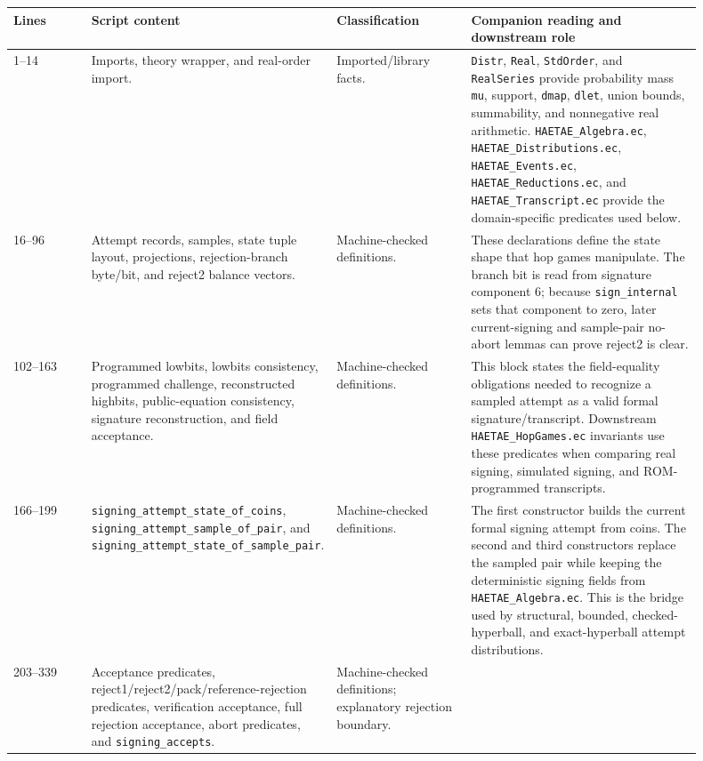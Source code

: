 \documentclass[11pt]{report}
\DeclareRobustCommand{\file}[1]{\ifmmode\text{\nolinkurl{#1}}\else\nolinkurl{#1}\fi}
\DeclareRobustCommand{\ec}[1]{\ifmmode\text{\nolinkurl{#1}}\else\nolinkurl{#1}\fi}
\theoremstyle{definition}
\theoremstyle{plain}
\begin{document}
\begin{longtable}{p{0.13\linewidth}p{0.19\linewidth}p{0.21\linewidth}p{0.37\linewidth}}
\toprule
\textbf{Lines} & \textbf{Script content} & \textbf{Classification} &
\textbf{Companion reading and downstream role} \\
\midrule
1--14 &
Imports, theory wrapper, and real-order import. &
Imported/library facts. &
\ec{Distr}, \ec{Real}, \ec{StdOrder}, and \ec{RealSeries} provide
probability mass \ec{mu}, support, \ec{dmap}, \ec{dlet}, union bounds,
summability, and nonnegative real arithmetic.  \file{HAETAE\_Algebra.ec},
\file{HAETAE\_Distributions.ec}, \file{HAETAE\_Events.ec},
\file{HAETAE\_Reductions.ec}, and \file{HAETAE\_Transcript.ec} provide the
domain-specific predicates used below. \\
\midrule
16--96 &
Attempt records, samples, state tuple layout, projections, rejection-branch
byte/bit, and reject2 balance vectors. &
Machine-checked definitions. &
These declarations define the state shape that hop games manipulate.  The
branch bit is read from signature component 6; because \ec{sign\_internal}
sets that component to zero, later current-signing and sample-pair no-abort
lemmas can prove reject2 is clear. \\
\midrule
102--163 &
Programmed lowbits, lowbits consistency, programmed challenge, reconstructed
highbits, public-equation consistency, signature reconstruction, and field
acceptance. &
Machine-checked definitions. &
This block states the field-equality obligations needed to recognize a
sampled attempt as a valid formal signature/transcript.  Downstream
\file{HAETAE\_HopGames.ec} invariants use these predicates when comparing
real signing, simulated signing, and ROM-programmed transcripts. \\
\midrule
166--199 &
\ec{signing\_attempt\_state\_of\_coins},
\ec{signing\_attempt\_sample\_of\_pair}, and
\ec{signing\_attempt\_state\_of\_sample\_pair}. &
Machine-checked definitions. &
The first constructor builds the current formal signing attempt from coins.
The second and third constructors replace the sampled pair while keeping the
deterministic signing fields from \file{HAETAE\_Algebra.ec}.  This is the
bridge used by structural, bounded, checked-hyperball, and exact-hyperball
attempt distributions. \\
\midrule
203--339 &
Acceptance predicates, reject1/reject2/pack/reference-rejection predicates,
verification acceptance, full rejection acceptance, abort predicates, and
\ec{signing\_accepts}. &
Machine-checked definitions; explanatory rejection boundary. &

\end{longtable}
\end{document}

